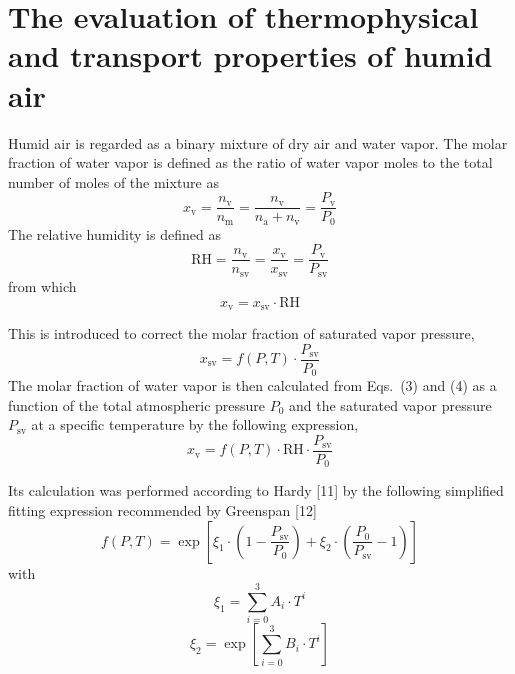 \documentclass[11pt]{article}
\newcommand{\Psv}{P_\mathrm{sv}}
\newcommand{\RH}{\mathrm{RH}}
\newcommand{\fPT}{f(P,T)}
\begin{document}
\section{The evaluation of thermophysical and transport properties
         of humid air}

Humid air is regarded as a binary mixture of dry air and water
vapor. The molar fraction of water vapor is defined as the ratio of
water vapor moles to the total number of moles of the mixture as
\begin{equation}
x_\mathrm{v} = \frac{n_\mathrm{v}}{n_\mathrm{m}}
             = \frac{n_\mathrm{v}}{n_\mathrm{a}+n_\mathrm{v}}
             = \frac{P_\mathrm{v}}{P_0}
\end{equation}
The relative humidity is defined as
\begin{equation}
\RH = \frac{n_\mathrm{v}}{n_\mathrm{sv}}
    = \frac{x_\mathrm{v}}{x_\mathrm{sv}}
    = \frac{P_\mathrm{v}}{\Psv}
\end{equation}
from which
\begin{equation}
x_\mathrm{v} = x_\mathrm{sv}\cdot\RH
\end{equation}


\noindent This is introduced to correct the molar fraction of
saturated vapor pressure,
\begin{equation}
x_\mathrm{sv} = \fPT\cdot\frac{\Psv}{P_0}
\end{equation}
The molar fraction of water vapor is then calculated from Eqs.~(3)
and (4) as a function of the total atmospheric pressure $P_0$ and the
saturated vapor pressure $\Psv$ at a specific temperature by the
following expression,
\begin{equation}
x_\mathrm{v} = \fPT\cdot\RH\cdot\frac{\Psv}{P_0}
\end{equation}

\noindent Its calculation was performed according to Hardy [11] by the
following simplified fitting expression recommended by
Greenspan [12]
\begin{equation}
\fPT = \exp\left[\xi_1\cdot\left(1-\frac{\Psv}{P_0}\right)
       + \xi_2\cdot\left(\frac{P_0}{\Psv}-1\right)\right]
\end{equation}
with
\begin{equation}
\xi_1 = \sum_{i=0}^{3} A_i\cdot T^{i}
\end{equation}
\begin{equation}
\xi_2 = \exp\left[\sum_{i=0}^{3} B_i\cdot T^{i}\right]
\end{equation}
\end{document}
